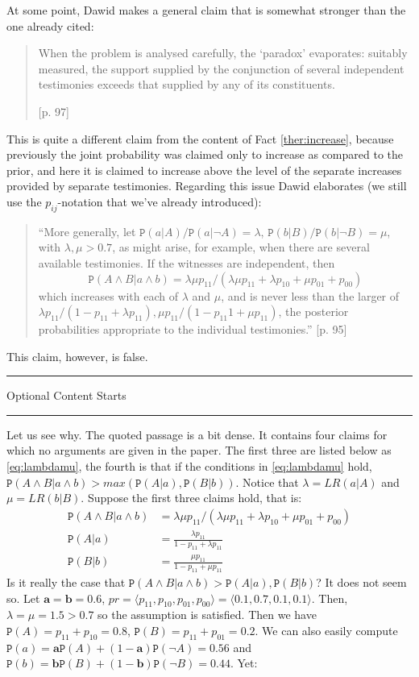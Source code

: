 \documentclass{ifcolog}
\newcommand{\intermezzoa}{
	\begin{minipage}[c]{13cm}
	\begin{center}\rule{10cm}{0.4pt}



	\tiny{\sc Optional Content Starts}
	
	\vspace{-1mm}
	
	\rule{10cm}{0.4pt}\end{center}
	\end{minipage}\nopagebreak 
	}
\newcommand{\pr}[1]{\mbox{$\mathtt{P}(#1)$}}
\newcommand{\n}{\neg}
\newcommand{\et}{\wedge}
\newcommand{\la}{\langle}
\newcommand{\ra}{\rangle}
\begin{document}
At some point, Dawid makes a  general claim that is somewhat stronger than the one already cited:
 \begin{quote} When the problem is analysed carefully, the `paradox' evaporates: suitably measured, the support supplied by the conjunction of several independent testimonies exceeds that supplied by any of its constituents.

  [p. 97]\end{quote}
This is quite a different claim from the content of Fact \ref{ther:increase}, because previously the joint probability was claimed only to increase as compared to the prior, and here it is claimed to increase above the level of the separate increases provided by separate testimonies. Regarding this issue Dawid elaborates (we still use the $p_{ij}$-notation that we've already introduced):
 \begin{quote}
 ``More generally, let $\pr{a\vert A}/\pr{a\vert \n A}=\lambda$, $\pr{b\vert B}/\pr{b\vert \n B}=\mu$, with $\lambda, \mu >0.7$, as might arise, for example, when there are several available testimonies. If the witnesses are
  independent, then \[\pr{A\et B\vert  a\et b} = \lambda \mu p_{11}/(\lambda \mu p_{11} + \lambda p_{10} +\mu p_{01} + p_{00})\] which  increases with
 each of $\lambda$ and $\mu$, and is never less than the larger of $\lambda p_{11}/(1-p_{11}+\lambda p_{11}),
 \mu p_{11} /(1- p_{11} 1 + \mu p_{11})$, the posterior probabilities appropriate to the individual testimonies.'' [p. 95]
 \end{quote}
This claim, however, is false.

\intermezzoa


Let us see why.   The quoted passage is a bit dense. It contains four claims for which no arguments are given in the paper. The first three are listed below as \eqref{eq:lambdamu}, the fourth is that if the conditions in \eqref{eq:lambdamu} hold,  $\pr{A\et B\vert  a\et b}>max(\pr{A\vert a},\pr{B\vert b})$.  Notice that $\lambda=LR(a\vert A)$ and $\mu=LR(b\vert B)$. Suppose the first three claims hold, that is:
 \begin{align}\label{eq:lambdamu}
 \pr{A\et B\vert  a\et b} &= \lambda \mu p_{11}/(\lambda \mu p_{11} + \lambda p_{10} +\mu p_{01} + p_{00})\\
 \pr{A\vert a} & = \frac{\lambda p_{11}}{1-p_{11}+\lambda p_{11}}\nonumber \\
 \pr{B\vert b} & = \frac{\mu p_{11}}{1-p_{11}+\mu p_{11}} \nonumber 
 \end{align}
 \noindent Is it really the case that  $\pr{A\et B\vert  a\et b}>\pr{A\vert a},\pr{B\vert b}$? It does not  seem so. Let $\mathbf{a}=\mathbf{b}=0.6$, $pr =\la p_{11},p_{10},p_{01},p_{00}\ra=\la 0.1, 0.7, 0.1, 0.1 \ra$. Then, $\lambda=\mu=1.5>0.7$ so the assumption is satisfied. 
Then we have $\pr{A}=p_{11}+p_{10}=0.8$, $\pr{B}=p_{11}+p_{01}=0.2$. We can also easily compute $\pr{a}=\mathbf{a}\pr{A}+(1-\mathbf{a})\pr{\n A}=0.56$ and $\pr{b}=\mathbf{b}\pr{B}+(1-\mathbf{b})\pr{\n B}=0.44$. 
 Yet:
\end{document}
